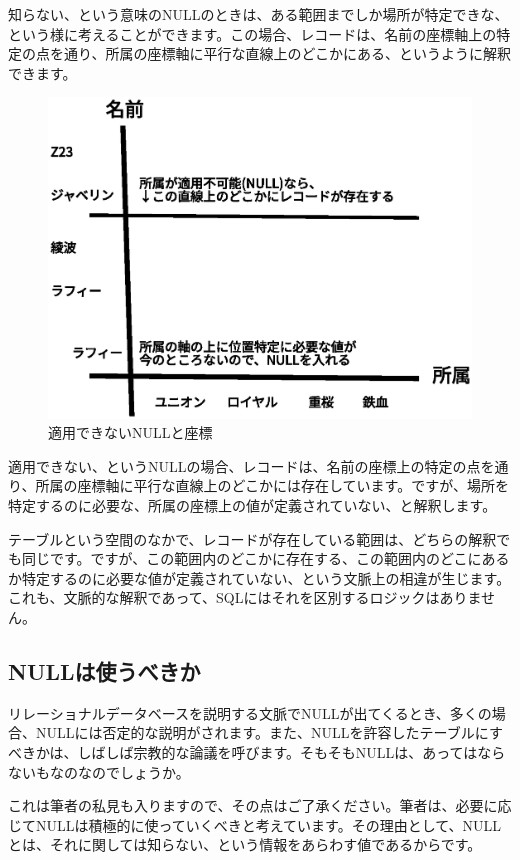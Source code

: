 知らない、という意味のNULLのときは、ある範囲までしか場所が特定できな、という様に考えることができます。この場合、レコードは、名前の座標軸上の特定の点を通り、所属の座標軸に平行な直線上のどこかにある、というように解釈できます。

\begin{figure}[htbp]
	\includegraphics[width=12cm,clip]{draw/not_attach.eps}
	\caption{適用できないNULLと座標}
	\label{fig:not_attach}
\end{figure}

適用できない、というNULLの場合、レコードは、名前の座標上の特定の点を通り、所属の座標軸に平行な直線上のどこかには存在しています。ですが、場所を特定するのに必要な、所属の座標上の値が定義されていない、と解釈します。

テーブルという空間のなかで、レコードが存在している範囲は、どちらの解釈でも同じです。ですが、この範囲内のどこかに存在する、この範囲内のどこにあるか特定するのに必要な値が定義されていない、という文脈上の相違が生じます。これも、文脈的な解釈であって、SQLにはそれを区別するロジックはありません。

\subsection{NULLは使うべきか}

リレーショナルデータベースを説明する文脈でNULLが出てくるとき、多くの場合、NULLには否定的な説明がされます。また、NULLを許容したテーブルにすべきかは、しばしば宗教的な論議を呼びます。そもそもNULLは、あってはならないもなのなのでしょうか。

これは筆者の私見も入りますので、その点はご了承ください。筆者は、必要に応じてNULLは積極的に使っていくべきと考えています。その理由として、NULLとは、それに関しては知らない、という情報をあらわす値であるからです。


